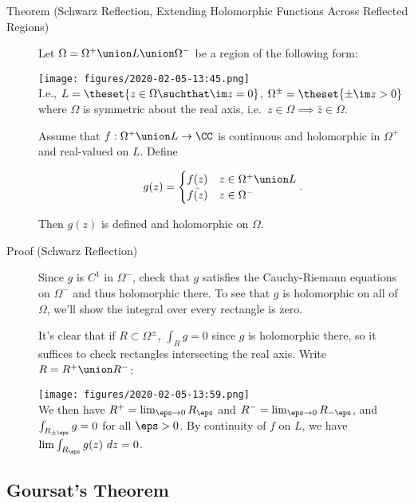 \begin{description}
\item[Theorem (Schwarz Reflection, Extending Holomorphic Functions
Across Reflected Regions)]
Let \(\Omega = \Omega^+ \union L \union \Omega^-\) be a region of the
following form:

\texttt{[image: figures/2020-02-05-13:45.png]}\\

I.e., \(L = \theset{z\in \Omega \suchthat \im z = 0}\),
\(\Omega^{\pm} = \theset{\pm \im z > 0}\) where \(\Omega\) is symmetric
about the real axis, i.e.~\(z\in \Omega \implies \bar z \in \Omega\).

Assume that \(f: \Omega^+ \union L \to \CC\) is continuous and
holomorphic in \(\Omega^+\) and real-valued on \(L\). Define

\begin{align*}
g(z) = 
\begin{cases}
f(z) & z\in \Omega^+ \union L \\
\bar{f(z)} & z\in \Omega^-
\end{cases}
.\end{align*}

Then \(g(z)\) is defined and holomorphic on \(\Omega\).
\item[Proof (Schwarz Reflection)]
Since \(g\) is \(C^1\) in \(\Omega^-\), check that \(g\) satisfies the
Cauchy-Riemann equations on \(\Omega^-\) and thus holomorphic there. To
see that \(g\) is holomorphic on all of \(\Omega\), we'll show the
integral over every rectangle is zero.

It's clear that if \(R\subset \Omega^{\pm}\), \(\int_R g = 0\) since
\(g\) is holomorphic there, so it suffices to check rectangles
intersecting the real axis. Write \(R = R^+ \union R^-\):

\texttt{[image: figures/2020-02-05-13:59.png]}\\

We then have \(R^+ = \lim_{\eps\to 0} R_\eps\) and
\(R^- = \lim_{\eps \to 0} R_{-\eps}\), and \(\int_{R_{\pm \eps}} g = 0\)
for all \(\eps > 0\). By continuity of \(f\) on \(L\), we have
\(\lim \int_{R_{\eps}} g(z) ~dz = 0\).
\end{description}

\hypertarget{goursats-theorem}{%
\subsection{Goursat's Theorem}\label{goursats-theorem}}

